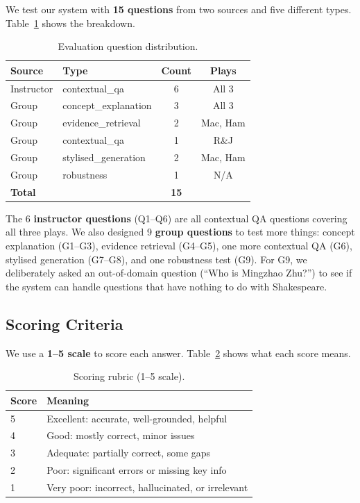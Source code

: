 \documentclass[10pt,conference]{IEEEtran}
\begin{document}
We test our system with \textbf{15 questions} from two sources and five different types. Table~\ref{tab:question-dist} shows the breakdown.

\begin{table}[h]
\centering
\caption{Evaluation question distribution.}
\label{tab:question-dist}
\begin{tabular}{llcc}
\toprule
Source & Type & Count & Plays \\
\midrule
Instructor & contextual\_qa & 6 & All 3 \\
\midrule
Group & concept\_explanation & 3 & All 3 \\
Group & evidence\_retrieval & 2 & Mac, Ham \\
Group & contextual\_qa & 1 & R\&J \\
Group & stylised\_generation & 2 & Mac, Ham \\
Group & robustness & 1 & N/A \\
\midrule
\textbf{Total} & & \textbf{15} & \\
\bottomrule
\end{tabular}
\end{table}

The 6 \textbf{instructor questions} (Q1--Q6) are all contextual QA questions covering all three plays. We also designed 9 \textbf{group questions} to test more things: concept explanation (G1--G3), evidence retrieval (G4--G5), one more contextual QA (G6), stylised generation (G7--G8), and one robustness test (G9). For G9, we deliberately asked an out-of-domain question (``Who is Mingzhao Zhu?'') to see if the system can handle questions that have nothing to do with Shakespeare.

\subsection{Scoring Criteria}

We use a \textbf{1--5 scale} to score each answer. Table~\ref{tab:rubric} shows what each score means.

\begin{table}[h]
\centering
\caption{Scoring rubric (1--5 scale).}
\label{tab:rubric}
\begin{tabularx}{\linewidth}{lX}
\toprule
Score & Meaning \\
\midrule
5 & Excellent: accurate, well-grounded, helpful \\
4 & Good: mostly correct, minor issues \\
3 & Adequate: partially correct, some gaps \\
2 & Poor: significant errors or missing key info \\
1 & Very poor: incorrect, hallucinated, or irrelevant \\
\bottomrule
\end{tabularx}
\end{table}
\end{document}
